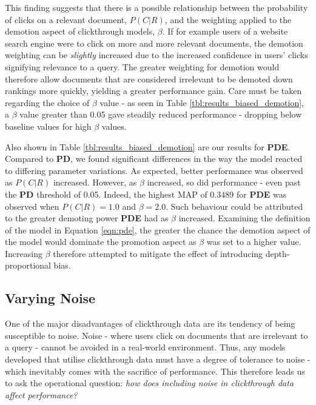 This finding suggests that there is a possible relationship between the probability of clicks on a relevant document, $P(C|R)$, and the weighting applied to the demotion aspect of clickthrough models, $\beta$. If for example users of a website search engine were to click on more and more relevant documents, the demotion weighting can be \emph{slightly} increased due to the increased confidence in users' clicks signifying relevance to a query. The greater weighting for demotion would therefore allow documents that are considered irrelevant to be demoted down rankings more quickly, yielding a greater performance gain. Care must be taken regarding the choice of $\beta$ value - as seen in Table \ref{tbl:results_biased_demotion}, a $\beta$ value greater than 0.05 gave steadily reduced performance - dropping below baseline values for high $\beta$ values.

Also shown in Table \ref{tbl:results_biased_demotion} are our results for \textbf{PDE}. Compared to \textbf{PD}, we found significant differences in the way the model reacted to differing parameter variations. As expected, better performance was observed as $P(C|R)$ increased. However, as $\beta$ increased, so did performance - even past the \textbf{PD} threshold of 0.05. Indeed, the highest MAP of 0.3489 for \textbf{PDE} was observed when $P(C|R) = 1.0$ and $\beta = 2.0$. Such behaviour could be attributed to the greater demoting power \textbf{PDE} had as $\beta$ increased. Examining the definition of the model in Equation \ref{eqn:pde}, the greater the chance the demotion aspect of the model would dominate the promotion aspect as $\beta$ was set to a higher value. Increasing $\beta$ therefore attempted to mitigate the effect of introducing depth-proportional bias.

\subsection{Varying Noise}
One of the major disadvantages of clickthrough data are its tendency of being susceptible to noise. Noise - where users click on documents that are irrelevant to a query - cannot be avoided in a real-world environment. Thus, any models developed that utilise clickthrough data must have a degree of tolerance to noise - which inevitably comes with the sacrifice of performance. This therefore leads us to ask the operational question: \emph{how does including noise in clickthrough data affect performance?}


